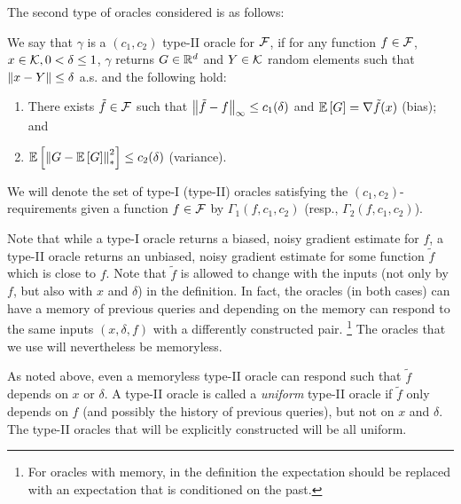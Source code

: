 The second type of oracles considered is as follows: 
\begin{definition}
\label{def:oracle2}
We say that $\gamma$ is a  $(c_1,c_2)$ type-II oracle for $\mathcal{F}$, if for any function $f\in \mathcal{F}$,
$x\in \mathcal{K},0<\delta\le 1$, $\gamma$ returns $G\in \mathbb{R}^d$ and  $Y\in \mathcal{K}$ random elements such that $\left\|x-Y\right\|\le \delta$ a.s. and the following hold:
\vspace{-0.2cm}
\begin{enumerate}
\item There exists $\tilde{f} \in \mathcal{F}$ such that
$\big\|\tilde{f}- f\big\|_\infty \le c_1(\delta)$  and
$\mathbb{E}\left[G\right]  = \nabla \tilde{f}(x)$ (bias); and
\item $\mathbb{E}\left[\left\| G -  \mathbb{E}\left[G\right] \right\|_*^2\right] \le c_2(\delta)$ (variance).
\end{enumerate}
\vspace{-0.1cm}
\end{definition}
We will denote the set of type-I (type-II) oracles satisfying the $(c_1,c_2)$-requirements given a function $f\in \mathcal{F}$ by $\Gamma_1(f,c_1,c_2)$ (resp., $\Gamma_2(f,c_1,c_2)$).

Note that while a type-I oracle returns a biased, noisy gradient estimate for $f$, 
a type-II oracle returns an unbiased, noisy gradient estimate for some function $\tilde{f}$ which is close to $f$.
Note that $\tilde{f}$ is allowed to change with the inputs (not only by $f$, but also with $x$ and $\delta$) in the definition.
In fact, the oracles (in both cases)  can have a memory of previous queries and depending on the memory
can respond to the same inputs $(x,\delta,f)$ with a differently constructed pair.%
\footnote{For oracles with memory, in the definition the expectation should be replaced with
an expectation that is conditioned on the past.}
The oracles that we use will nevertheless be memoryless.

As noted above, even a memoryless type-II oracle can respond such that $\tilde{f}$ depends on $x$ or $\delta$.
A type-II oracle is called a \emph{uniform} type-II oracle if $\tilde{f}$ only depends on $f$ (and possibly the history of previous queries), but not on $x$ and $\delta$.
The type-II oracles that will be explicitly constructed will be all uniform.
%

